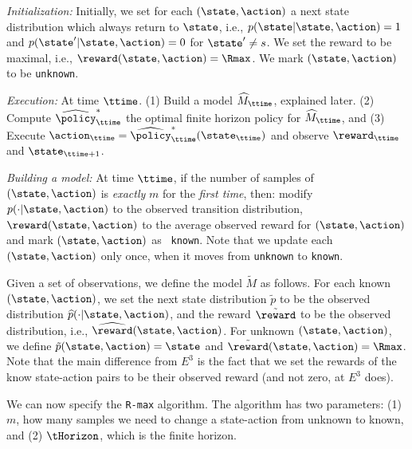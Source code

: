 {\em Initialization:} Initially, we set for each $(\state,\action)$
a next state distribution which always return to $\state$, i.e.,
$p(\state|\state,\action)=1$ and $p(\state'|\state,\action)=0$ for
$\state'\neq s$. We set the reward to be maximal, i.e.,
$\reward(\state,\action)=\Rmax$. We mark $(\state,\action)$ to be
{\tt unknown}.

{\em Execution:} At time $\ttime$. (1) Build a model
$\widehat{M}_\ttime$, explained later. (2) Compute
$\widehat{\policy}^*_\ttime$ the optimal finite horizon policy for
$\widehat{M}_\ttime$, and (3) Execute
$\action_\ttime=\widehat{\policy}^*_\ttime(\state_\ttime)$ and
observe $\reward_\ttime$ and $\state_{\ttime+1}$.

{\em Building a model:} At time $\ttime$, if the number of samples
of $(\state,\action)$ is {\em exactly} $m$ for the {\em first time},
then: modify $p(\cdot|\state,\action)$ to the observed transition
distribution, $\reward(\state,\action)$ to the average observed
reward for $(\state,\action)$ and mark $(\state,\action)$ as {\tt
known}. Note that we update each $(\state,\action)$ only once, when
it moves from {\tt unknown} to {\tt known}.


Given a set of observations, we define the model $\tilde{M}$ as
follows. For each known $(\state,\action)$, we set the next state
distribution $\tilde{p}$ to be the observed distribution
$\widehat{p}(\cdot|\state,\action)$, and the reward
$\tilde{\reward}$ to be the observed distribution, i.e.,
$\widehat{\reward}(\state,\action)$.
%
For unknown $(\state,\action)$, we define
$\tilde{p}(\state,\action)=\state$ and
$\tilde{\reward}(\state,\action)=\Rmax$. Note that the main
difference from $E^3$ is the fact that we set the rewards of the
know state-action pairs to be their observed reward (and not zero,
at $E^3$ does).

We can now specify the {\tt R-max} algorithm. The algorithm has two
parameters: (1) $m$, how many samples we need to change a
state-action from unknown to known, and (2) $\tHorizon$, which is
the finite horizon.

